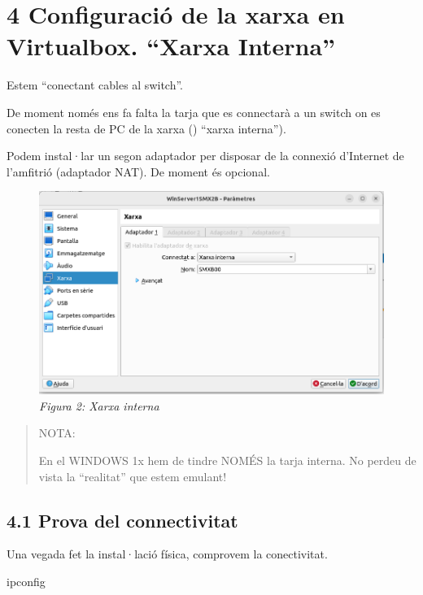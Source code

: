 \documentclass[
  a4paper,
]{article}
\newenvironment{Shaded}{\begin{snugshade}}{\end{snugshade}}
\newcommand{\NormalTok}[1]{#1}
\begin{document}
\section{4 Configuració de la xarxa en Virtualbox. ``Xarxa
Interna''}\label{configuraciuxf3-de-la-xarxa-en-virtualbox.-xarxa-interna}

Estem ``conectant cables al switch''.

De moment només ens fa falta la tarja que es connectarà a un switch on
es conecten la resta de PC de la xarxa () ``xarxa interna'').

Podem instal·lar un segon adaptador per disposar de la connexió
d'Internet de l'amfitrió (adaptador NAT). De moment és opcional.

\begin{figure}
\centering
\includegraphics{png/xarxainterna.png}
\caption{\emph{Figura 2: Xarxa interna}}
\end{figure}

\begin{quote}
NOTA:

En el WINDOWS 1x hem de tindre NOMÉS la tarja interna. No perdeu de
vista la ``realitat'' que estem emulant!
\end{quote}

\subsection{4.1 Prova del connectivitat}\label{prova-del-connectivitat}

Una vegada fet la instal·lació física, comprovem la conectivitat.

\begin{Shaded}
\begin{Highlighting}[]
\NormalTok{ipconfig}
\end{Highlighting}
\end{Shaded}
\end{document}

